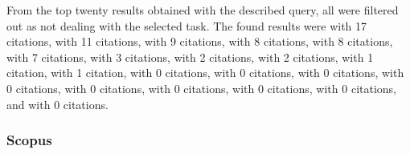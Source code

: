 From the top twenty results obtained with the described query, all were filtered out as not dealing with the selected task. The found results were \cite{dl-rs-built-up-areas} with 17 citations, \cite{dl-bird-detection} with 11 citations, \cite{dnn-iot} with 9 citations, \cite{dl-sl-wetland} with 8 citations, \cite{dl-corneal-epithelium} with 8 citations, \cite{dl-age-estimation} with 7 citations, \cite{cnn-parking-occupacy} with 3 citations, \cite{ground-measurement-forest} with 2 citations, \cite{bike-sharing-destination} with 2 citations, \cite{w-net-lc} with 1 citation, \cite{mimo-fmcw-parking} with 1 citation, \cite{urban-green-obesity} with 0 citations, \cite{robust-parking-surveillance} with 0 citations, \cite{social-media-open-space} with 0 citations, \cite{dcnn-parking-detection} with 0 citations, \cite{review-crowd-monitoring} with 0 citations, \cite{dl-galapagos-snake} with 0 citations, \cite{deep-binary-vehicle} with 0 citations, \cite{cnn-parrots} with 0 citations, and \cite{indoor-positioning-error} with 0 citations.

\subsubsection{Scopus}
\label{urban-green-scopus}